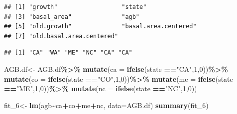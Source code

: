 \documentclass[
]{article}
\newenvironment{Shaded}{\begin{snugshade}}{\end{snugshade}}
\newcommand{\AttributeTok}[1]{\textcolor[rgb]{0.13,0.29,0.53}{#1}}
\newcommand{\DecValTok}[1]{\textcolor[rgb]{0.00,0.00,0.81}{#1}}
\newcommand{\FunctionTok}[1]{\textcolor[rgb]{0.13,0.29,0.53}{\textbf{#1}}}
\newcommand{\NormalTok}[1]{#1}
\newcommand{\OtherTok}[1]{\textcolor[rgb]{0.56,0.35,0.01}{#1}}
\newcommand{\SpecialCharTok}[1]{\textcolor[rgb]{0.81,0.36,0.00}{\textbf{#1}}}
\newcommand{\StringTok}[1]{\textcolor[rgb]{0.31,0.60,0.02}{#1}}
\begin{document}
\begin{verbatim}
## [1] "growth"                  "state"                  
## [3] "basal_area"              "agb"                    
## [5] "old.growth"              "basal.area.centered"    
## [7] "old.basal.area.centered"
\end{verbatim}

\begin{Shaded}
\end{Shaded}

\begin{verbatim}
## [1] "CA" "WA" "ME" "NC" "CA" "CA"
\end{verbatim}

\begin{Shaded}
\begin{Highlighting}[]
\NormalTok{AGB.df}\OtherTok{\textless{}{-}}\NormalTok{ AGB.df}\SpecialCharTok{\%\textgreater{}\%}
  \FunctionTok{mutate}\NormalTok{(}\AttributeTok{ca =} \FunctionTok{ifelse}\NormalTok{(state }\SpecialCharTok{==}\StringTok{"CA"}\NormalTok{,}\DecValTok{1}\NormalTok{,}\DecValTok{0}\NormalTok{))}\SpecialCharTok{\%\textgreater{}\%}
  \FunctionTok{mutate}\NormalTok{(}\AttributeTok{co =} \FunctionTok{ifelse}\NormalTok{(state }\SpecialCharTok{==}\StringTok{"CO"}\NormalTok{,}\DecValTok{1}\NormalTok{,}\DecValTok{0}\NormalTok{))}\SpecialCharTok{\%\textgreater{}\%}
  \FunctionTok{mutate}\NormalTok{(}\AttributeTok{me =} \FunctionTok{ifelse}\NormalTok{(state }\SpecialCharTok{==}\StringTok{"ME"}\NormalTok{,}\DecValTok{1}\NormalTok{,}\DecValTok{0}\NormalTok{))}\SpecialCharTok{\%\textgreater{}\%}
  \FunctionTok{mutate}\NormalTok{(}\AttributeTok{nc =} \FunctionTok{ifelse}\NormalTok{(state }\SpecialCharTok{==}\StringTok{"NC"}\NormalTok{,}\DecValTok{1}\NormalTok{,}\DecValTok{0}\NormalTok{))}

\NormalTok{fit\_6}\OtherTok{\textless{}{-}} \FunctionTok{lm}\NormalTok{(agb}\SpecialCharTok{\textasciitilde{}}\NormalTok{ca}\SpecialCharTok{+}\NormalTok{co}\SpecialCharTok{+}\NormalTok{me}\SpecialCharTok{+}\NormalTok{nc, }\AttributeTok{data=}\NormalTok{AGB.df) }
\FunctionTok{summary}\NormalTok{(fit\_6)}
\end{Highlighting}
\end{Shaded}
\end{document}
